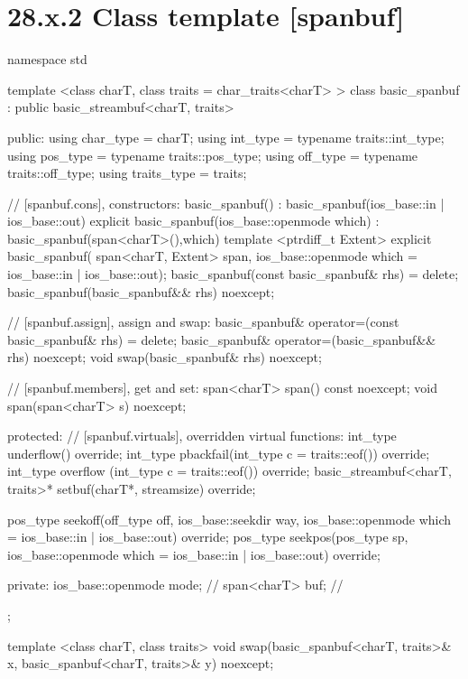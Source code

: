 \documentclass[ebook,11pt,article]{memoir}
\renewcommand{\iref}[1]{[#1]}
\begin{document}
\section{28.x.2 Class template  [spanbuf]}
\begin{codeblock}
namespace std {
  template <class charT, class traits = char_traits<charT> >
  class basic_spanbuf
    : public basic_streambuf<charT, traits> {
  public:
    using char_type      = charT;
    using int_type       = typename traits::int_type;
    using pos_type       = typename traits::pos_type;
    using off_type       = typename traits::off_type;
    using traits_type    = traits;

    // \iref{spanbuf.cons}, constructors:
    basic_spanbuf() : basic_spanbuf(ios_base::in | ios_base::out) {}
    explicit basic_spanbuf(ios_base::openmode which)
      : basic_spanbuf(span<charT>(),which) {}
    template <ptrdiff_t Extent>
    explicit basic_spanbuf(
      span<charT, Extent> span,
      ios_base::openmode which = ios_base::in | ios_base::out);
    basic_spanbuf(const basic_spanbuf& rhs) = delete;
    basic_spanbuf(basic_spanbuf&& rhs) noexcept;

    // \iref{spanbuf.assign}, assign and swap:
    basic_spanbuf& operator=(const basic_spanbuf& rhs) = delete;
    basic_spanbuf& operator=(basic_spanbuf&& rhs) noexcept;
    void swap(basic_spanbuf& rhs) noexcept;

    // \iref{spanbuf.members}, get and set:
    span<charT> span() const noexcept;
    void span(span<charT> s) noexcept;

  protected:
    // \iref{spanbuf.virtuals}, overridden virtual functions:
    int_type underflow() override;
    int_type pbackfail(int_type c = traits::eof()) override;
    int_type overflow (int_type c = traits::eof()) override;
    basic_streambuf<charT, traits>* setbuf(charT*, streamsize) override;

    pos_type seekoff(off_type off, ios_base::seekdir way,
                     ios_base::openmode which
                      = ios_base::in | ios_base::out) override;
    pos_type seekpos(pos_type sp,
                     ios_base::openmode which
                      = ios_base::in | ios_base::out) override;

  private:
    ios_base::openmode mode;  // \expos
    span<charT> buf; // \expos
  };

  template <class charT, class traits>
    void swap(basic_spanbuf<charT, traits>& x,
              basic_spanbuf<charT, traits>& y) noexcept;
}
\end{codeblock}
\end{document}
